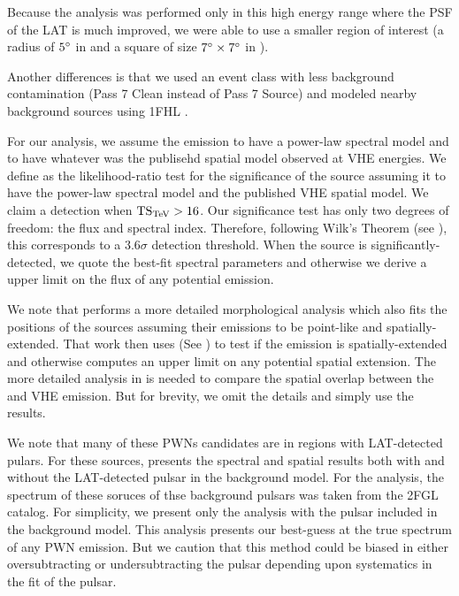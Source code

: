 Because the analysis was performed only in this high energy range where
the \ac{PSF} of the \ac{LAT} is much improved, we were able to use
a smaller region of interest (a radius of $5^\circ$ in \pointlike 
and a square of size $7^\circ\times7^\circ$ in \gtlike).

Another differences is that we used an event class with less background
contamination (Pass 7 Clean instead of Pass 7 Source) and modeled
nearby background sources using \ac{1FHL} \citep{ackermann_2013a_first-fermi-lat}.

For our analysis, we assume the \gev emission to have a power-law spectral
model and to have whatever was the publisehd spatial model observed at
\ac{VHE} energies.  We define \tstev as the likelihood-ratio test for the
significance of the source assuming it to have the power-law spectral
model and the published \ac{VHE} spatial model.  We claim a detection
when $\mathrm{TS}_\text{TeV} > 16$.  Our significance test has only two degrees of freedom:
the flux and spectral index.  Therefore, following Wilk's Theorem (see
), this corresponds to a $3.6\sigma$
detection threshold. When the source is significantly-detected, we quote
the best-fit spectral parameters and otherwise we derive a upper limit
on the flux of any potential emission.

We note that \cite{acero_2013a_constraints-galactic} performs a more
detailed morphological analysis which also fits the positions of the
sources assuming their emissions to be point-like and spatially-extended.
That work then uses \tsext (See ) to test
if the emission is spatially-extended and otherwise computes an upper
limit on any potential spatial extension.  The more detailed analysis in
\cite{acero_2013a_constraints-galactic} is needed to compare the spatial
overlap between the \gev and \ac{VHE} emission. But for brevity, we omit the
details and simply use the results.

We note that many of these \acp{PWN} candidates are
in regions with \ac{LAT}-detected pulars.  For these sources,
\cite{acero_2013a_constraints-galactic} presents the spectral and
spatial results both with and without the \ac{LAT}-detected pulsar in the
background model. For the analysis, the spectrum of these soruces of thse
background pulsars was taken from the \ac{2FGL} catalog.  For simplicity,
we present only the analysis with the pulsar included in the background
model. This analysis presents our best-guess at the true spectrum of
any \ac{PWN} emission.  But we caution that this method could be biased
in either oversubtracting or undersubtracting the pulsar depending upon
systematics in the fit of the pulsar.

